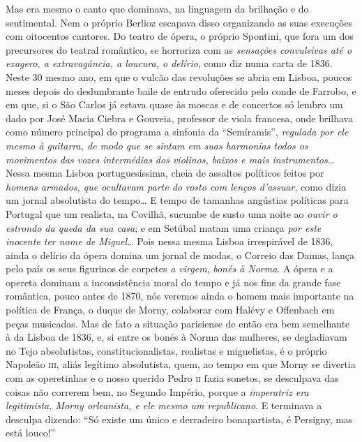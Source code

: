 Mas era mesmo o canto que dominava, na linguagem da brilhação e do
sentimental. Nem o próprio Berlioz escapava disso organizando as suas
execuções com oitocentos cantores. Do teatro de ópera, o próprio
Spontini, que fora um dos precursores do teatral romântico, se horroriza
com as \textit{sensações convulsivas até o exagero, a extravagância, a
loucura, o delírio}, como diz numa carta de 1836. Neste 30 mesmo ano,
em que o vulcão das revoluções se abria em Lisboa, poucos meses depois
do deslumbrante baile de entrudo oferecido pelo conde de Farrobo, e em
que, si o São Carlos já estava quase às moscas e de concertos só lembro
um dado por José Macia Ciebra e Gouveia, professor de viola francesa,
onde brilhava como número principal do programa a sinfonia da
``Semíramis'', \textit{regulada por ele mesmo à guitarra, de modo que se
sintam em suas harmonias todos os movimentos das vozes intermédias dos
violinos, baixos e mais instrumentos}\ldots{} Nessa mesma Lisboa
portuguesíssima, cheia de assaltos políticos feitos por \textit{homens
armados, que ocultavam parte do rosto com lenços d'assuar}, como dizia
um jornal absolutista do tempo\ldots{} E tempo de tamanhas angústias
políticas para Portugal que um realista, na Covilhã, sucumbe de susto
uma noite ao \textit{ouvir o estrondo da queda da sua casa}; e em Setúbal
matam uma criança \textit{por este inocente ter nome de Miguel}\ldots{} Pois nessa
mesma Lisboa irrespirável de 1836, ainda o delírio da ópera domina um
jornal de modas, o Correio das Damas, lança pelo país os seus figurinos
de corpetes \textit{a virgem}, \textit{bonés à Norma}. A ópera e a opereta dominam
a inconsistência moral do tempo e já nos fins da grande fase romântica,
pouco antes de 1870, nós veremos ainda o homem mais importante na política
de França, o duque de Morny, colaborar com Halévy e Offenbach em peças
musicadas. Mas de fato a situação parisiense de então era bem semelhante
à da Lisboa de 1836, e, si entre os bonés à Norma das mulheres, se
degladiavam no Tejo absolutistas, constitucionalistas, realistas e
miguelistas, é o próprio Napoleão \textsc{iii}, aliás legítimo absolutista, quem,
ao tempo em que Morny se divertia com as operetinhas e o nosso querido
Pedro \textsc{ii} fazia sonetos, se desculpava das coisas não correrem bem, no
Segundo Império, porque a \textit{imperatriz era legitimista, Morny
orleanista, e ele mesmo um republicano}. E terminava a desculpa
dizendo: ``Só existe um único e derradeiro bonapartista, é Persigny, mas
está louco!''

